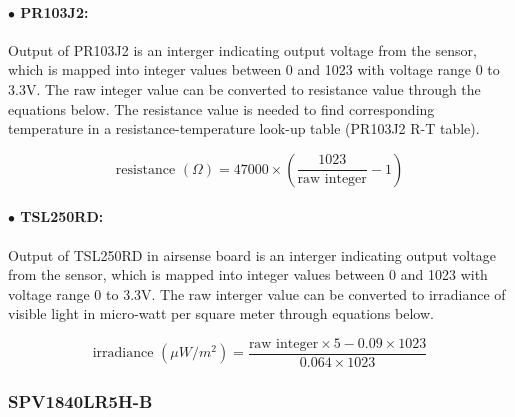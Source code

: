 \paragraph{$\bullet$ PR103J2:}
Output of PR103J2 is an interger indicating output voltage from the sensor, which is mapped into integer values between 0 and 1023 with voltage range 0 to 3.3V. The raw integer value can be converted to resistance value through the equations below. The resistance value is needed to find corresponding temperature in a resistance-temperature look-up table (PR103J2 R-T table).

{\centering
 \[ \text{resistance } (\Omega) = 47000 \times \left(\frac{1023}{\text{raw integer}} - 1\right) \]
 \par
 }

\paragraph{$\bullet$ TSL250RD:}

Output of TSL250RD in airsense board is an interger indicating output voltage from the sensor, which is mapped into integer values between 0 and 1023 with voltage range 0 to 3.3V. The raw interger value can be converted to irradiance of visible light in micro-watt per square meter through equations below.


{\centering
\[ \text{irradiance } (\mu W/m^2) = \frac{\text{raw integer} \times 5 - 0.09 \times 1023}{0.064 \times 1023} \]
\par
}




% 

\subsubsection{ SPV1840LR5H-B}

